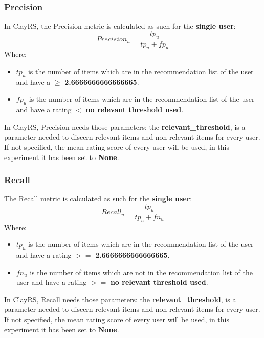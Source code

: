 \documentclass[11pt]{article}
\begin{document}
\subsubsection{Precision}\label{subsubsec:precision}
In ClayRS, the Precision metric is calculated as such for the \textbf{single user}:
\hfill\break
\hfill\break
    \[
         Precision_u = \frac{tp_u}{tp_u + fp_u}
    \]
\hfill\break
\hfill\break
    Where:
\begin{itemize}
    \item $tp_u$ is the number of items which are in the recommendation list of the user and have a
       $\geq$         \textbf{2.6666666666666665}.
            \item $fp_u$ is the number of items which are in the recommendation list of the user and have a
      rating $<$         \textbf{no relevant threshold used}.
        \end{itemize}
\hfill\break
\hfill\break
In ClayRS, Precision needs those parameters:
the \textbf{relevant\_threshold}, is a parameter needed to discern relevant items and non-relevant items for every user.
If not specified, the mean rating score of every user will be used, in this experiment it has been set to
\textbf{None}.
\hfill\break
\hfill\break

\subsubsection{Recall}\label{subsubsec:recall}
The Recall metric is calculated as such for the \textbf{single user}:
\hfill\break
\hfill\break
    \[
        Recall_u = \frac{tp_u}{tp_u + fn_u}
    \]
\hfill\break
\hfill\break
    Where:
\begin{itemize}
    \item $tp_u$ is the number of items which are in the recommendation list of the user and have a
      rating $>=$         \textbf{2.6666666666666665}.
            \item $fn_u$ is the number of items which are not in the recommendation list of the user and have a
      rating $>=$         \textbf{no relevant threshold used}.
        \end{itemize}
\hfill\break
\hfill\break
In ClayRS, Recall needs those parameters:
the \textbf{relevant\_threshold}, is a parameter needed to discern relevant items and non-relevant items for every user.
If not specified, the mean rating score of every user will be used, in this experiment it has been set to
\textbf{None}.
\hfill\break
\hfill\break
\end{document}
